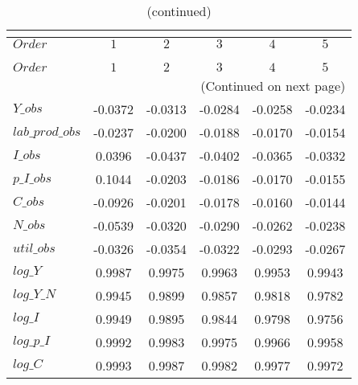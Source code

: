  
\begin{center}
\begin{longtable}{lccccc} 
\caption{COEFFICIENTS OF AUTOCORRELATION}\\
 \label{Table:th_autocorr_matrix}\\
\toprule 
$Order           $	 & 	 $          1$	 & 	 $          2$	 & 	 $          3$	 & 	 $          4$	 & 	 $          5$\\
\midrule \endfirsthead 
\caption{(continued)}\\
 \toprule \\ 
$Order           $	 & 	 $          1$	 & 	 $          2$	 & 	 $          3$	 & 	 $          4$	 & 	 $          5$\\
\midrule \endhead 
\midrule \multicolumn{6}{r}{(Continued on next page)} \\ \bottomrule \endfoot 
\bottomrule \endlastfoot 
$Y\_obs          $	 & 	    -0.0372	 & 	    -0.0313	 & 	    -0.0284	 & 	    -0.0258	 & 	    -0.0234 \\ 
$lab\_prod\_obs  $	 & 	    -0.0237	 & 	    -0.0200	 & 	    -0.0188	 & 	    -0.0170	 & 	    -0.0154 \\ 
$I\_obs          $	 & 	     0.0396	 & 	    -0.0437	 & 	    -0.0402	 & 	    -0.0365	 & 	    -0.0332 \\ 
$p\_I\_obs       $	 & 	     0.1044	 & 	    -0.0203	 & 	    -0.0186	 & 	    -0.0170	 & 	    -0.0155 \\ 
$C\_obs          $	 & 	    -0.0926	 & 	    -0.0201	 & 	    -0.0178	 & 	    -0.0160	 & 	    -0.0144 \\ 
$N\_obs          $	 & 	    -0.0539	 & 	    -0.0320	 & 	    -0.0290	 & 	    -0.0262	 & 	    -0.0238 \\ 
$util\_obs       $	 & 	    -0.0326	 & 	    -0.0354	 & 	    -0.0322	 & 	    -0.0293	 & 	    -0.0267 \\ 
$log\_Y          $	 & 	     0.9987	 & 	     0.9975	 & 	     0.9963	 & 	     0.9953	 & 	     0.9943 \\ 
$log\_Y\_N       $	 & 	     0.9945	 & 	     0.9899	 & 	     0.9857	 & 	     0.9818	 & 	     0.9782 \\ 
$log\_I          $	 & 	     0.9949	 & 	     0.9895	 & 	     0.9844	 & 	     0.9798	 & 	     0.9756 \\ 
$log\_p\_I       $	 & 	     0.9992	 & 	     0.9983	 & 	     0.9975	 & 	     0.9966	 & 	     0.9958 \\ 
$log\_C          $	 & 	     0.9993	 & 	     0.9987	 & 	     0.9982	 & 	     0.9977	 & 	     0.9972 \\ 

\end{longtable}
\end{center}
